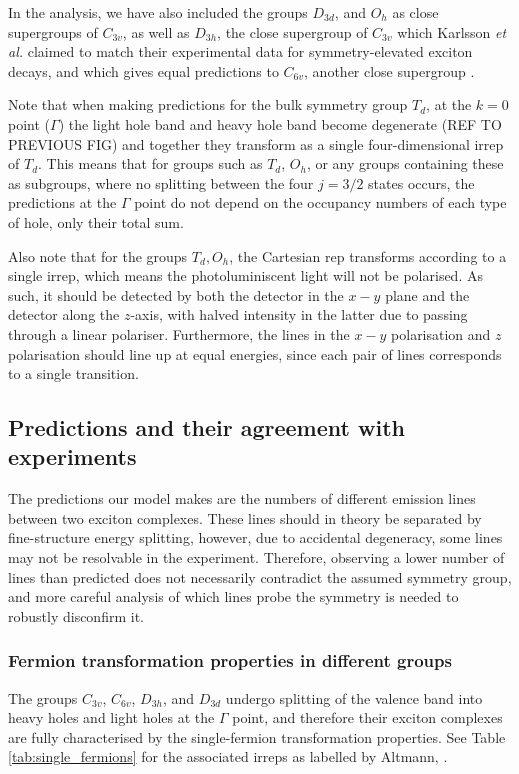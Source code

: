 In the analysis, we have also included the groups $D_{3d}$, and $O_h$ as close supergroups of $C_{3v}$, as well as $D_{3h}$, the close supergroup of $C_{3v}$ which Karlsson \textit{et al.} claimed to match their experimental data for symmetry-elevated exciton decays, and which gives equal predictions to $C_{6v}$, another close supergroup \cite[p. 19]{karlsson} .

Note that when making predictions for the bulk symmetry group $T_d$, at the $k=0$ point ($\Gamma$) the light hole band and heavy hole band become degenerate (REF TO PREVIOUS FIG) and together they transform as a single four-dimensional irrep of $T_d$. This means that for groups such as $T_d$, $O_h$, or any groups containing these as subgroups, where no splitting between the four $j=3/2$ states occurs, the predictions at the $\Gamma$ point do not depend on the occupancy numbers of each type of hole, only their total sum.

Also note that for the groups $T_d, O_h$, the Cartesian rep transforms according to a single irrep, which means the photoluminiscent light will not be polarised. As such, it should be detected by both the detector in the $x-y$ plane and the detector along the $z$-axis, with halved intensity in the latter due to passing through a linear polariser. Furthermore, the lines in the $x-y$ polarisation and $z$ polarisation should line up at equal energies, since each pair of lines corresponds to a single transition.

\subsection{Predictions and their agreement with experiments}
The predictions our model makes are the numbers of different emission lines between two exciton complexes. These lines should in theory be separated by fine-structure energy splitting, however, due to accidental degeneracy, some lines may not be resolvable in the experiment. Therefore, observing a lower number of lines than predicted does not necessarily contradict the assumed symmetry group, and more careful analysis of which lines probe the symmetry is needed to robustly disconfirm it.

\subsubsection{Fermion transformation properties in different groups}
The groups $C_{3v}$, $C_{6v}$, $D_{3h}$, and $D_{3d}$ undergo splitting of the valence band into heavy holes and light holes at the $\Gamma$ point, and therefore their exciton complexes are fully characterised by the single-fermion transformation properties. See Table \ref{tab:single_fermions} for the associated irreps as labelled by Altmann, \cite{altmann}.

